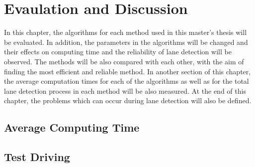 %
\chapter{Evaulation and Discussion}
\label{cha:Evaulation and Discussion}

In this chapter, the algorithms for each method used in this master's thesis will be evaluated. In addition, the parameters in the algorithms will be changed and their effects on computing time and the reliability of lane detection will be observed. The methods will be also compared with each other, with the aim of finding the most efficient and reliable method. In another section of this chapter, the average computation times for each of the algorithms as well as for the total lane detection process in each method will be also measured. At the end of this chapter, the problems which can occur during lane detection will also be defined.
%

\section{Average Computing Time}\label{sec:Average Computing Time}



\section{Test Driving}\label{sec:Test Driving}
